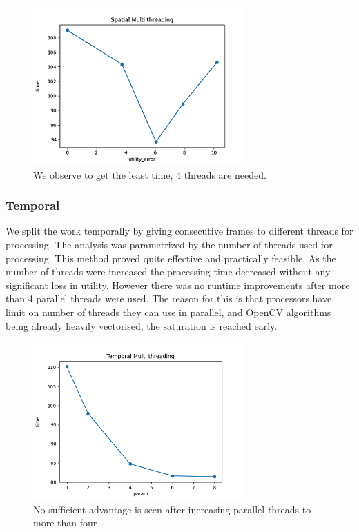 \documentclass[conference]{IEEEtran}
\begin{document}
\begin{figure}[htbp]
\centerline{\includegraphics{plots/plot_split_frame_eVt.png}}
\caption{We observe to get the least time, 4 threads are needed.}
\label{smt_evt} 
\end{figure}


\subsubsection{Temporal}
We split the work temporally by giving consecutive frames to different threads for processing. The analysis was parametrized by the number of threads used for processing. This method proved quite effective and practically feasible. As the number of threads were increased the processing time decreased without any significant loss in utility.
However there was no runtime improvements after more than 4 parallel threads were used. The reason for this is that processors have limit on number of threads they can use in parallel, and OpenCV algorithms being already heavily vectorised, the saturation is reached early.

\begin{figure}[htbp]
\centerline{\includegraphics{plots/plot_split_video_pVt.png}}
\caption{No sufficient advantage is seen after increasing parallel threads to more than four}
\label{tmt_pvt} 
\end{figure}
\end{document}
